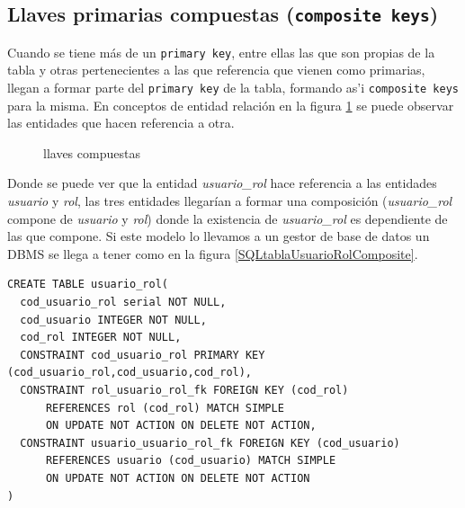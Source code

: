 \subsection{Llaves primarias compuestas (\texttt{composite keys})}
Cuando se tiene m\'as de un \texttt{primary key}, entre ellas las que son propias de la tabla y otras pertenecientes a las que referencia que vienen como primarias, llegan a formar parte del \texttt{primary key} de la tabla, formando as'i \texttt{composite keys} para la misma. En conceptos de entidad relaci\'on en la figura  \ref{fig:llaves compuestas} se puede observar  las entidades que hacen referencia a otra.
\begin{figure}[H]
\centering
{}
\caption{llaves compuestas} \label{fig:llaves compuestas}
\end{figure}
Donde se puede ver que la entidad \textit{usuario\_rol} hace referencia a las entidades \textit{usuario} y \textit{rol}, las tres entidades llegar\'ian a formar una composici\'on  (\textit{usuario\_rol} compone de \textit{usuario} y \textit{rol}) donde la existencia de \textit{usuario\_rol} es dependiente de las que compone. Si este modelo lo llevamos a un gestor de base de datos un DBMS se llega a tener como en la figura \ref{SQLtablaUsuarioRolComposite}.\\
\lstset{language=sql,breaklines=true}
\label{SQLtablaUsuarioRolComposite}
\begin{lstlisting}
CREATE TABLE usuario_rol(
  cod_usuario_rol serial NOT NULL,
  cod_usuario INTEGER NOT NULL,
  cod_rol INTEGER NOT NULL,
  CONSTRAINT cod_usuario_rol PRIMARY KEY (cod_usuario_rol,cod_usuario,cod_rol),
  CONSTRAINT rol_usuario_rol_fk FOREIGN KEY (cod_rol)
      REFERENCES rol (cod_rol) MATCH SIMPLE
      ON UPDATE NOT ACTION ON DELETE NOT ACTION,
  CONSTRAINT usuario_usuario_rol_fk FOREIGN KEY (cod_usuario)
      REFERENCES usuario (cod_usuario) MATCH SIMPLE
      ON UPDATE NOT ACTION ON DELETE NOT ACTION
)
\end{lstlisting}
